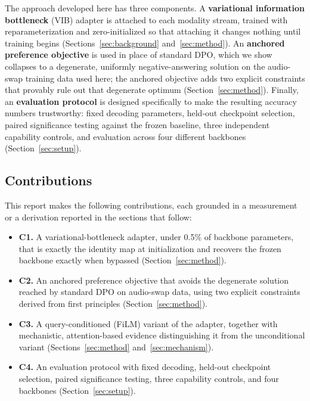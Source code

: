 \documentclass[11pt,a4paper,oneside]{article}
\begin{document}
The approach developed here has three components. A \textbf{variational information bottleneck}
(VIB) adapter is attached to each modality stream, trained with reparameterization and zero-initialized
so that attaching it changes nothing until training begins (Sections~\ref{sec:background}
and~\ref{sec:method}). An \textbf{anchored preference objective} is used in place of standard DPO,
which we show collapses to a degenerate, uniformly negative-answering solution on the audio-swap
training data used here; the anchored objective adds two explicit constraints that provably rule out
that degenerate optimum (Section~\ref{sec:method}). Finally, an \textbf{evaluation protocol} is
designed specifically to make the resulting accuracy numbers trustworthy: fixed decoding parameters,
held-out checkpoint selection, paired significance testing against the frozen baseline, three
independent capability controls, and evaluation across four different backbones
(Section~\ref{sec:setup}).

\subsection{Contributions}

This report makes the following contributions, each grounded in a measurement or a derivation
reported in the sections that follow:

\begin{itemize}
\item \textbf{C1.} A variational-bottleneck adapter, under 0.5\% of backbone parameters, that is
exactly the identity map at initialization and recovers the frozen backbone exactly when bypassed
(Section~\ref{sec:method}).
\item \textbf{C2.} An anchored preference objective that avoids the degenerate solution reached by
standard DPO on audio-swap data, using two explicit constraints derived from first principles
(Section~\ref{sec:method}).
\item \textbf{C3.} A query-conditioned (FiLM) variant of the adapter, together with mechanistic,
attention-based evidence distinguishing it from the unconditional variant (Sections~\ref{sec:method}
and~\ref{sec:mechanism}).
\item \textbf{C4.} An evaluation protocol with fixed decoding, held-out checkpoint selection, paired
significance testing, three capability controls, and four backbones (Section~\ref{sec:setup}).
\end{itemize}
\end{document}
